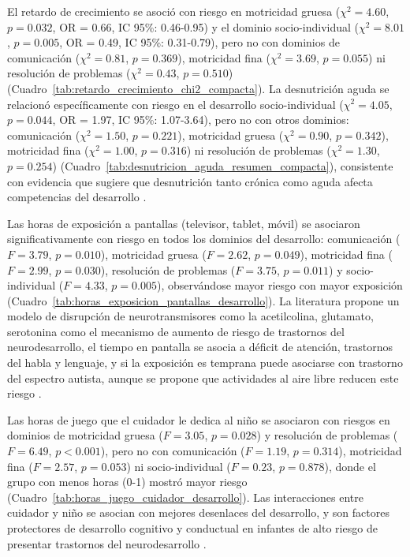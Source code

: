 El retardo de crecimiento se asoció con riesgo en motricidad gruesa
($\chi^2 = 4.60$, $p = 0.032$, OR = 0.66, IC 95\%: 0.46-0.95) y el dominio
socio-individual ($\chi^2 = 8.01$, $p = 0.005$, OR = 0.49, IC 95\%: 0.31-0.79),
pero no con dominios de comunicación ($\chi^2 = 0.81$, $p = 0.369$), motricidad
fina ($\chi^2 = 3.69$, $p = 0.055$) ni resolución de problemas ($\chi^2 = 0.43$, $p = 0.510$) 
(Cuadro~\ref{tab:retardo_crecimiento_chi2_compacta}). La desnutrición aguda 
se relacionó específicamente con riesgo en el desarrollo socio-individual
($\chi^2 = 4.05$, $p = 0.044$, OR = 1.97, IC 95\%: 1.07-3.64), pero no con otros
dominios:  comunicación ($\chi^2 = 1.50$, $p = 0.221$), motricidad gruesa 
($\chi^2 = 0.90$, $p = 0.342$), motricidad fina ($\chi^2 = 1.00$, $p = 0.316$) 
ni resolución de problemas ($\chi^2 = 1.30$, $p = 0.254$) 
(Cuadro~\ref{tab:desnutricion_aguda_resumen_compacta}), consistente con 
evidencia que sugiere que desnutrición tanto crónica como aguda afecta
competencias del desarrollo \cite{Babikako2022,Suryawan2021,vandenHeuvel2019}.

Las horas de exposición a pantallas (televisor, tablet, móvil) se asociaron
significativamente con riesgo en todos los dominios del desarrollo: comunicación
($F = 3.79$, $p = 0.010$), motricidad gruesa ($F = 2.62$, $p = 0.049$),
motricidad fina ($F = 2.99$, $p = 0.030$), resolución de problemas ($F = 3.75$,
$p = 0.011$) y  socio-individual ($F = 4.33$, $p = 0.005$), observándose mayor
riesgo con mayor exposición
(Cuadro~\ref{tab:horas_exposicion_pantallas_desarrollo}). La literatura propone
un modelo de disrupción de neurotransmisores como la acetilcolina, glutamato,
serotonina como el mecanismo de aumento de riesgo de trastornos del
neurodesarrollo, el tiempo en pantalla se asocia a déficit de atención,
trastornos del habla y lenguaje, y si la exposición es temprana puede asociarse
con trastorno del espectro autista, aunque se propone que actividades al aire
libre reducen este riesgo \cite{Priyadarshini2025,Zehra2025,Hill2024,Sarfraz2023,Amorim2023,Sugiyama2023,Goswami2023,Jourdren2023}.

Las horas de juego que el cuidador le dedica al niño se asociaron con riesgos en
dominios de motricidad gruesa ($F = 3.05$, $p = 0.028$) y resolución de
problemas ($F = 6.49$, $p < 0.001$), pero no con comunicación ($F = 1.19$,
$p = 0.314$), motricidad fina ($F = 2.57$, $p = 0.053$) ni socio-individual
($F = 0.23$, $p = 0.878$), donde el grupo con menos horas (0-1) mostró mayor
riesgo (Cuadro~\ref{tab:horas_juego_cuidador_desarrollo}). Las interacciones
entre cuidador y niño se asocian con mejores desenlaces del desarrollo, y son
factores protectores de desarrollo cognitivo y conductual en infantes de alto
riesgo de presentar trastornos del neurodesarrollo
\cite{Jaffee2007,Isaev2023,Schneider2022}.

